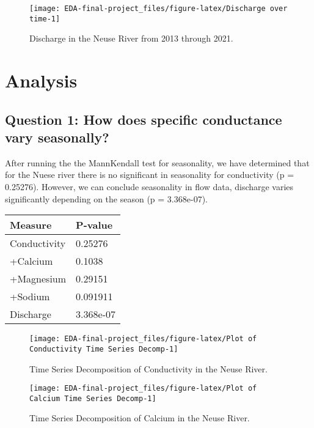 \documentclass[
  12pt,
]{article}
\begin{document}
\begin{figure}

\texttt{[image: EDA-final-project\_files/figure-latex/Discharge over time-1]} \hfill{}

\caption{Discharge in the Neuse River from 2013 through 2021.}\label{fig:Discharge over time}
\end{figure}

\newpage

\hypertarget{analysis}{%
\section{Analysis}\label{analysis}}

\hypertarget{question-1-how-does-specific-conductance-vary-seasonally}{%
\subsection{Question 1: How does specific conductance vary
seasonally?}\label{question-1-how-does-specific-conductance-vary-seasonally}}

After running the the MannKendall test for seasonality, we have
determined that for the Nuese river there is no significant in
seasonality for conductivity (p = 0.25276). However, we can conclude
seasonality in flow data, discharge varies significantly depending on
the season (p = 3.368e-07).

\begin{longtable}[]{@{}ll@{}}
\toprule
Measure & P-value \\
\midrule
\endhead
Conductivity & 0.25276 \\
+Calcium & 0.1038 \\
+Magnesium & 0.29151 \\
+Sodium & 0.091911 \\
Discharge & 3.368e-07 \\
\bottomrule
\end{longtable}

\begin{figure}

\texttt{[image: EDA-final-project\_files/figure-latex/Plot of Conductivity Time Series Decomp-1]} \hfill{}

\caption{Time Series Decomposition of Conductivity in the Neuse River.}\label{fig:Plot of Conductivity Time Series Decomp}
\end{figure}

\begin{figure}

\texttt{[image: EDA-final-project\_files/figure-latex/Plot of Calcium Time Series Decomp-1]} \hfill{}

\caption{Time Series Decomposition of Calcium in the Neuse River.}\label{fig:Plot of Calcium Time Series Decomp}
\end{figure}
\end{document}
